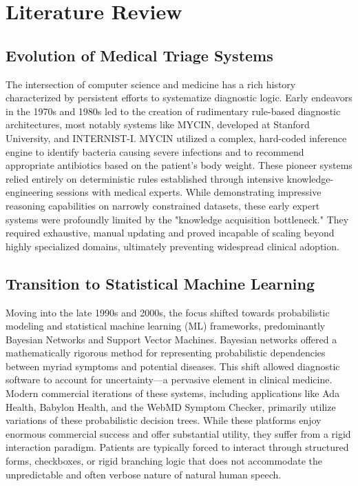 \documentclass[12pt]{article}
\begin{document}
\newpage
\section{Literature Review}

\subsection{Evolution of Medical Triage Systems}
The intersection of computer science and medicine has a rich history characterized by persistent efforts to systematize diagnostic logic. Early endeavors in the 1970s and 1980s led to the creation of rudimentary rule-based diagnostic architectures, most notably systems like MYCIN, developed at Stanford University, and INTERNIST-I. MYCIN utilized a complex, hard-coded inference engine to identify bacteria causing severe infections and to recommend appropriate antibiotics based on the patient's body weight. These pioneer systems relied entirely on deterministic rules established through intensive knowledge-engineering sessions with medical experts. While demonstrating impressive reasoning capabilities on narrowly constrained datasets, these early expert systems were profoundly limited by the "knowledge acquisition bottleneck." They required exhaustive, manual updating and proved incapable of scaling beyond highly specialized domains, ultimately preventing widespread clinical adoption.

\subsection{Transition to Statistical Machine Learning}
Moving into the late 1990s and 2000s, the focus shifted towards probabilistic modeling and statistical machine learning (ML) frameworks, predominantly Bayesian Networks and Support Vector Machines. Bayesian networks offered a mathematically rigorous method for representing probabilistic dependencies between myriad symptoms and potential diseases. This shift allowed diagnostic software to account for uncertainty—a pervasive element in clinical medicine. Modern commercial iterations of these systems, including applications like Ada Health, Babylon Health, and the WebMD Symptom Checker, primarily utilize variations of these probabilistic decision trees. While these platforms enjoy enormous commercial success and offer substantial utility, they suffer from a rigid interaction paradigm. Patients are typically forced to interact through structured forms, checkboxes, or rigid branching logic that does not accommodate the unpredictable and often verbose nature of natural human speech.
\end{document}
